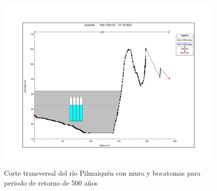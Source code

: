 \documentclass{article} %
\begin{document}
\begin{figure}[H]
    \centering
    \includegraphics[width=0.6\linewidth]{imagenes/corte_500_cb.pdf}
    \caption{Corte transversal del río Pilmaiquén con muro y bocatomas para periodo de retorno de 500 años}
\end{figure}
\end{document}
